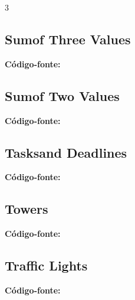 \documentclass[8pt]{extarticle}
\begin{document}
\begin{multicols*}{3}
\subsection{Sumof Three Values}
\begin{caixaenunciado}

\end{caixaenunciado}
\vspace{0.3cm}
\noindent\textbf{Código-fonte:}


\subsection{Sumof Two Values}
\begin{caixaenunciado}

\end{caixaenunciado}
\vspace{0.3cm}
\noindent\textbf{Código-fonte:}


\subsection{Tasksand Deadlines}
\begin{caixaenunciado}

\end{caixaenunciado}
\vspace{0.3cm}
\noindent\textbf{Código-fonte:}


\subsection{Towers}
\begin{caixaenunciado}

\end{caixaenunciado}
\vspace{0.3cm}
\noindent\textbf{Código-fonte:}


\subsection{Traffic Lights}
\begin{caixaenunciado}

\end{caixaenunciado}
\vspace{0.3cm}
\noindent\textbf{Código-fonte:}

\end{multicols*}
\end{document}
